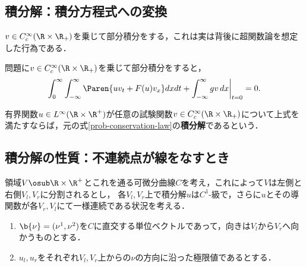 \documentclass[uplatex,dvipdfmx]{jsreport}
\begin{document}
\subsection{積分解：積分方程式への変換}

\begin{tcolorbox}[colframe=ForestGreen, colback=ForestGreen!10!white,breakable,colbacktitle=ForestGreen!40!white,coltitle=black,fonttitle=\bfseries\sffamily,
title=]
    $v\in C_c^\infty(\R\times\R_+)$を乗じて部分積分をする，これは実は背後に超関数論を想定した行為である．
\end{tcolorbox}

\begin{observation}
    問題に$v\in C_c^\infty(\R\times\R_+)$を乗じて部分積分をすると，
    \[\int_0^\infty\int^\infty_{-\infty}\Paren{uv_t+F(u)v_x}dxdt+\int^\infty_{-\infty}gv\,dx\biggr|_{t=0}=0.\]
\end{observation}

\begin{definition}
    有界関数$u\in L^\infty(\R\times\R^+)$が任意の試験関数$v\in C_c^\infty(\R\times\R_+)$について上式を満たすならば，元の式\ref{prob-conservation-law}の\textbf{積分解}であるという．
\end{definition}

\subsection{積分解の性質：不連続点が線をなすとき}

\begin{problem}
    領域$V\osub\R\times\R^+$とこれを通る可微分曲線$C$を考え，これによって$V$は左側と右側$V_l,V_r$に分割されるとし，
    各$V_l,V_r$上で積分解$u$は$C^1$-級で，さらに$u$とその導関数が各$V_r,V_l$にて一様連続である状況を考える．
    \begin{enumerate}
        \item $\b{\nu}=(\nu^1,\nu^2)$を$C$に直交する単位ベクトルであって，向きは$V_l$から$V_r$へ向かうものとする．
        \item $u_l,u_r$をそれぞれ$V_l,V_r$上からの$\nu$の方向に沿った極限値であるとする．
    \end{enumerate}
\end{problem}
\end{document}
